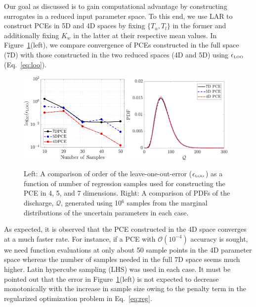 Our goal as discussed is to gain computational advantage by constructing
surrogates in a reduced input parameter space. To this end, we use LAR to 
construct PCEs
in 5D and 4D spaces by fixing $\{T_u,T_l\}$ in the former and additionally
fixing $K_w$ in the latter at their respective mean values. In
Figure~\ref{fig:conv_bore}(left), we compare convergence of PCEs constructed in the
full space (7D) with those constructed in the two reduced spaces (4D and 5D)
using $\epsilon_{\mbox{\tiny{LOO}}}$ (Eq.~\ref{eq:loo}). 

\begin{figure}[htbp]
 \begin{center}
  \includegraphics[width=0.48\textwidth]{./Figures/err_samples_borehole}
  \includegraphics[width=0.48\textwidth]{./Figures/pdf_comp_borehole}
\caption{Left: A comparison of order of the leave-one-out-error 
($\epsilon_{\mbox{\tiny{LOO}}}$) as a function of number of regression samples
used for constructing the PCE in 4, 5, and 7 dimensions. Right: A comparison of
PDFs of the discharge, $\mathcal{Q}$, generated using 10$^{6}$ samples from
the marginal distributions of the uncertain parameters in each case.} 
\label{fig:conv_bore}
\end{center}
\end{figure}

As expected, it is observed that the PCE constructed in the 4D space converges
at a much faster rate. For instance, if a PCE with $\mathcal{O}(10^{-4})$
accuracy is sought, we need function evaluations at only about 50 sample points
in the 4D parameter space whereas the number of samples needed in the full 7D
space seems much higher. Latin hypercube sampling (LHS) was used in
each case. It must be pointed out that the error in Figure~\ref{fig:conv_bore}(left)
is not expected to decrease monotonically with the increase in sample size
owing to the penalty term in the regularized optimization problem in Eq.~\ref{eq:reg}. 


